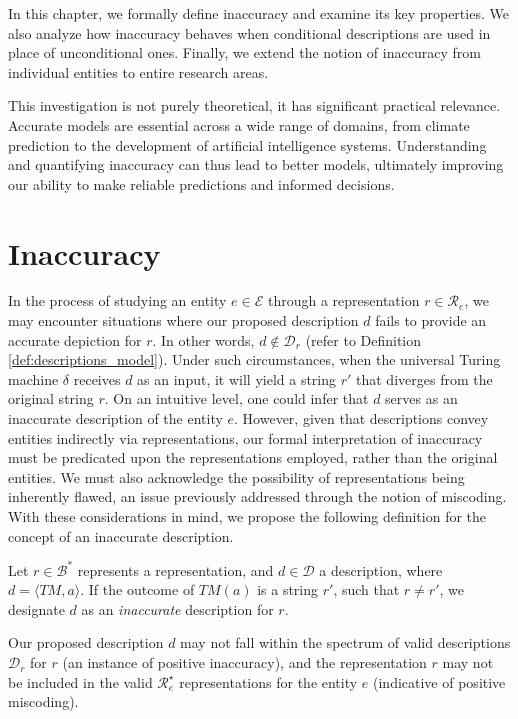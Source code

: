 In this chapter, we formally define inaccuracy and examine its key properties. We also analyze how inaccuracy behaves when conditional descriptions are used in place of unconditional ones. Finally, we extend the notion of inaccuracy from individual entities to entire research areas.

This investigation is not purely theoretical, it has significant practical relevance. Accurate models are essential across a wide range of domains, from climate prediction to the development of artificial intelligence systems. Understanding and quantifying inaccuracy can thus lead to better models, ultimately improving our ability to make reliable predictions and informed decisions.

%
%

\section{Inaccuracy}
\label{sec:inaccuracy:inaccuracy}

In the process of studying an entity $e \in \mathcal{E}$ through a representation $r \in \mathcal{R}_e$, we may encounter situations where our proposed description $d$ fails to provide an accurate depiction for $r$. In other words, $d \notin \mathcal{D}_r$ (refer to Definition \ref{def:descriptions_model}). Under such circumstances, when the universal Turing machine $\delta$ receives $d$ as an input, it will yield a string $r'$ that diverges from the original string $r$. On an intuitive level, one could infer that $d$ serves as an inaccurate description of the entity $e$. However, given that descriptions convey entities indirectly via representations, our formal interpretation of inaccuracy must be predicated upon the representations employed, rather than the original entities. We must also acknowledge the possibility of representations being inherently flawed, an issue previously addressed through the notion of miscoding. With these considerations in mind, we propose the following definition for the concept of an inaccurate description.

\begin{definition}
Let $r \in \mathcal{B}^\ast$ represents a representation, and $d \in \mathcal{D}$ a description, where $d = \langle TM, a \rangle$. If the outcome of $TM(a)$ is a string $r'$, such that $r \neq r'$, we designate $d$ as an \emph{inaccurate} description for $r$.
\end{definition}

Our proposed description $d$ may not fall within the spectrum of valid descriptions $\mathcal{D}_r$ for $r$ (an instance of positive inaccuracy), and the representation $r$ may not be included in the valid $\mathcal{R}^\star_e$ representations for the entity $e$ (indicative of positive miscoding).

